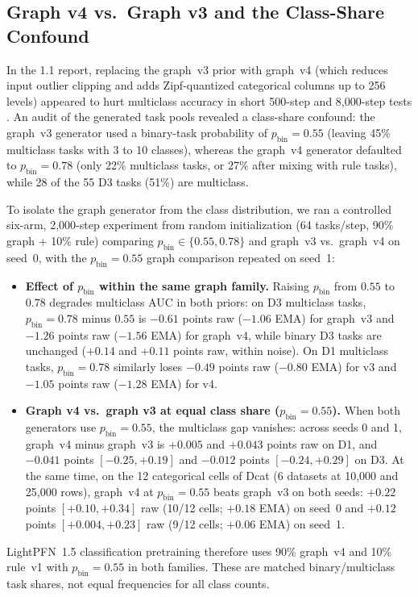 \documentclass[11pt]{article}
\begin{document}
\subsection{Graph v4 vs.\ Graph v3 and the Class-Share Confound}
\label{sec:classeq}

In the 1.1 report, replacing the graph~v3 prior with graph~v4 (which reduces input outlier clipping and adds Zipf-quantized categorical columns up to 256 levels) appeared to hurt multiclass accuracy in short 500-step and 8,000-step tests \cite[Section~4]{ottoboni2026lightpfn}.
An audit of the generated task pools revealed a class-share confound: the graph~v3 generator used a binary-task probability of $p_{\mathrm{bin}}=0.55$ (leaving 45\% multiclass tasks with 3 to 10 classes), whereas the graph~v4 generator defaulted to $p_{\mathrm{bin}}=0.78$ (only 22\% multiclass tasks, or 27\% after mixing with rule tasks), while 28 of the 55 D3 tasks (51\%) are multiclass. %

To isolate the graph generator from the class distribution, we ran a controlled six-arm, 2,000-step experiment from random initialization (64 tasks/step, 90\% graph + 10\% rule) comparing $p_{\mathrm{bin}} \in \{0.55, 0.78\}$ and graph~v3 vs.\ graph~v4 on seed~0, with the $p_{\mathrm{bin}}=0.55$ graph comparison repeated on seed~1: %
\begin{itemize}
\item \textbf{Effect of $p_{\mathrm{bin}}$ within the same graph family.}
Raising $p_{\mathrm{bin}}$ from $0.55$ to $0.78$ degrades multiclass AUC in both priors: on D3 multiclass tasks, $p_{\mathrm{bin}}=0.78$ minus $0.55$ is $-0.61$ points raw ($-1.06$ EMA) for graph~v3 and $-1.26$ points raw ($-1.56$ EMA) for graph~v4, while binary D3 tasks are unchanged ($+0.14$ and $+0.11$ points raw, within noise). %
On D1 multiclass tasks, $p_{\mathrm{bin}}=0.78$ similarly loses $-0.49$ points raw ($-0.80$ EMA) for v3 and $-1.05$ points raw ($-1.28$ EMA) for v4. %
\item \textbf{Graph v4 vs.\ graph v3 at equal class share ($p_{\mathrm{bin}}=0.55$).}
When both generators use $p_{\mathrm{bin}}=0.55$, the multiclass gap vanishes: across seeds 0 and 1, graph~v4 minus graph~v3 is $+0.005$ and $+0.043$ points raw on D1, and $-0.041$ points $[-0.25,+0.19]$ and $-0.012$ points $[-0.24,+0.29]$ on D3. %
At the same time, on the 12 categorical cells of Dcat (6 datasets at 10,000 and 25,000 rows), graph~v4 at $p_{\mathrm{bin}}=0.55$ beats graph~v3 on both seeds: $+0.22$ points $[+0.10, +0.34]$ raw (10/12 cells; $+0.18$ EMA) on seed~0 and $+0.12$ points $[+0.004, +0.23]$ raw (9/12 cells; $+0.06$ EMA) on seed~1. %
\end{itemize}
LightPFN~1.5 classification pretraining therefore uses 90\% graph~v4 and 10\% rule~v1 with $p_{\mathrm{bin}}=0.55$ in both families. These are matched binary/multiclass task shares, not equal frequencies for all class counts.
\end{document}
